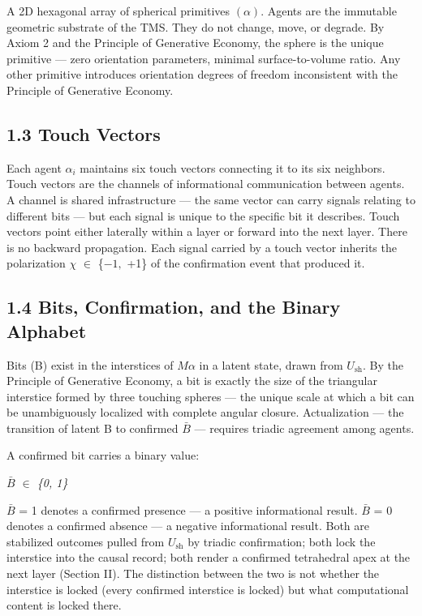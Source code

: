 \documentclass[11pt,oneside]{report}
\theoremstyle{definition}
\theoremstyle{remark}
\begin{document}
A 2D hexagonal array of spherical primitives \ensuremath{(\alpha ).} Agents are the
immutable geometric substrate of the TMS. They do not change, move, or
degrade. By Axiom 2 and the Principle of Generative Economy, the sphere
is the unique primitive --- zero orientation parameters, minimal
surface-to-volume ratio. Any other primitive introduces orientation
degrees of freedom inconsistent with the Principle of Generative
Economy.

\subsection*{1.3 Touch Vectors}

Each agent \ensuremath{\alpha_{i}} maintains six touch vectors connecting it to its six
neighbors. Touch vectors are the channels of informational communication
between agents. A channel is shared infrastructure --- the same vector
can carry signals relating to different bits --- but each signal is
unique to the specific bit it describes. Touch vectors point either
laterally within a layer or forward into the next layer. There is no
backward propagation. Each signal carried by a touch vector inherits the
polarization \ensuremath{\chi} \ensuremath{\in} \{\ensuremath{-1,} +1\} of the confirmation event that produced it.

\subsection*{1.4 Bits, Confirmation, and the Binary Alphabet}

Bits (B) exist in the interstices of \ensuremath{M\alpha} in a latent state, drawn from
\ensuremath{U_{\mathrm{sh}}.} By the Principle of Generative Economy, a bit is exactly the size
of the triangular interstice formed by three touching spheres --- the
unique scale at which a bit can be unambiguously localized with complete
angular closure. Actualization --- the transition of latent B to
confirmed \ensuremath{\bar{B}} --- requires triadic agreement among agents.

A confirmed bit carries a binary value:

\emph{\ensuremath{\bar{B}} \ensuremath{\in} \{0, 1\}}

\ensuremath{\bar{B}} = 1 denotes a confirmed presence --- a positive informational result.
\ensuremath{\bar{B}} = 0 denotes a confirmed absence --- a negative informational result.
Both are stabilized outcomes pulled from \ensuremath{U_{\mathrm{sh}}} by triadic confirmation;
both lock the interstice into the causal record; both render a confirmed
tetrahedral apex at the next layer (Section II). The distinction between
the two is not whether the interstice is locked (every confirmed
interstice is locked) but what computational content is locked there.
\end{document}
